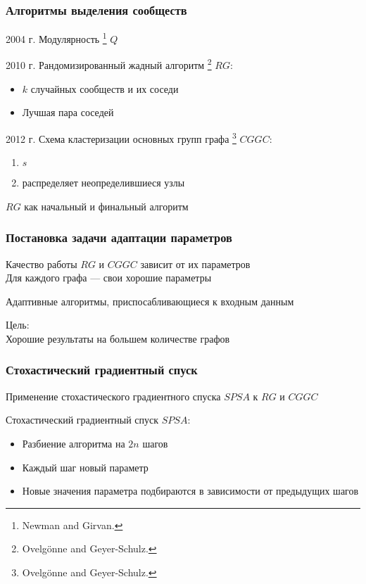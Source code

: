 \begin{frame}
	\frametitle{Алгоритмы выделения сообществ}

	2004 г. Модулярность%
	\footnote{\scriptsize Newman and Girvan. }
	 $Q$
	\vspace{.5em}

	2010 г. Рандомизированный жадный алгоритм%
	\footnote{\scriptsize Ovelg{\"o}nne and Geyer-Schulz. } $RG$:
	\begin{itemize}
		\item $k$ случайных сообществ и их соседи
		\item Лучшая пара соседей
	\end{itemize}\vspace{.5em}

	2012 г. Схема кластеризации основных групп графа%
	\footnote{\scriptsize Ovelg{\"o}nne and Geyer-Schulz. } $CGGC$:
	\begin{enumerate}
		\item $s$ 
		\item {} распределяет неопределившиеся узлы
	\end{enumerate}\vspace{.5em}


	$RG$ как начальный и финальный алгоритм
\end{frame}


\begin{frame}
	\frametitle{Постановка задачи адаптации параметров}
	Качество работы $RG$ и $CGGC$ зависит от их параметров\\
	Для каждого графа --- свои хорошие параметры \vspace{2em}

	Адаптивные алгоритмы, приспосабливающиеся к входным данным \vspace{2em}

	Цель:\\
	Хорошие результаты на большем количестве графов
\end{frame}

\begin{frame}
	\frametitle{Стохастический градиентный спуск}
	Применение стохастического градиентного спуска $SPSA$ к $RG$ и $CGGC$ \vspace{1em}

	Стохастический градиентный спуск $SPSA$:
	\begin{itemize}
		\item Разбиение алгоритма на $2n$ шагов
		\item Каждый шаг новый параметр
		\item Новые значения параметра подбираются в зависимости от предыдущих шагов
	\end{itemize}

\end{frame}

